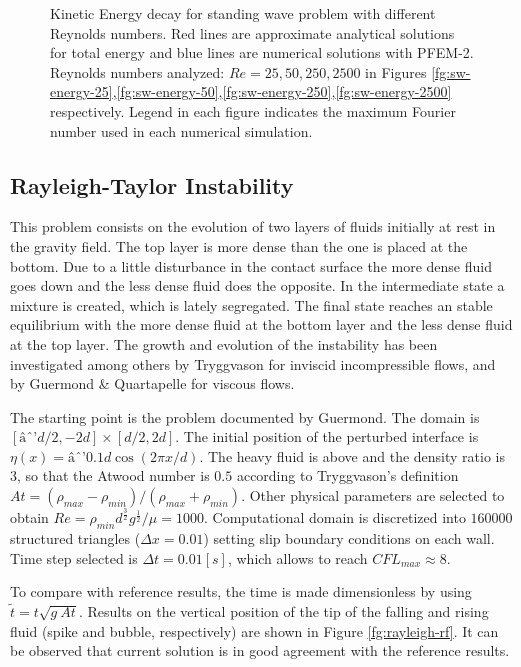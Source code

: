 \documentclass[a4paper,conference]{IEEEtran}
\begin{document}
\begin{figure}[h]
{    }
   \caption{Kinetic Energy decay for standing wave problem with different Reynolds numbers. Red lines are approximate analytical solutions for total energy and blue lines are numerical solutions with PFEM-2. Reynolds numbers analyzed: $Re=25,50,250,2500$ in Figures \ref{fg:sw-energy-25},\ref{fg:sw-energy-50},\ref{fg:sw-energy-250},\ref{fg:sw-energy-2500} respectively. Legend in each figure indicates the maximum Fourier number used in each numerical simulation.}
   \label{fg:sw-energy}
\end{figure}
\subsection{Rayleigh-Taylor Instability}

This problem consists on the evolution of two layers of fluids initially at rest in the gravity field. The top layer is more dense than the one is placed at the bottom. Due to a little disturbance in the contact surface the more dense fluid goes down and the less dense fluid does the opposite. In the intermediate state a mixture is created, which is lately segregated. The final state reaches an stable equilibrium with the more dense fluid at the bottom layer and the less dense fluid at the top layer. The growth and evolution of the instability has been investigated among others by Tryggvason\cite{Tryggvason88} for inviscid incompressible flows, and by Guermond
\& Quartapelle\cite{Guermond00} for viscous flows.

The starting point is the problem documented by Guermond. The domain is $[âd/2,-2d]\times[d/2,2d]$. The initial position of the perturbed interface is $\eta(x) = â0.1d \cos(2\pi x/d)$. The heavy fluid is above and the density ratio is $3$, so that the Atwood
number is $0.5$ according to Tryggvason's definition $At = (\rho_{max}-\rho_{min})/(\rho_{max}+\rho_{min})$. Other physical parameters are selected to obtain $Re=\rho_{min}d^{\frac{3}{2}}g^{\frac{1}{2}}/\mu=1000$. Computational domain is discretized into $160000$ structured triangles ($\Delta x=0.01$) setting slip boundary conditions on each wall. Time step selected is $\Delta t=0.01[s]$, which allows to reach $CFL_{max} \approx 8$.

To compare with reference results, the time is made dimensionless by using $\widetilde{t} = t\sqrt{g\ At}$. Results on the vertical position of the tip of the falling and rising fluid (spike and bubble, respectively) are shown in Figure \ref{fg:rayleigh-rf}. It can be observed that current solution is in good agreement with the reference results.
\end{document}
